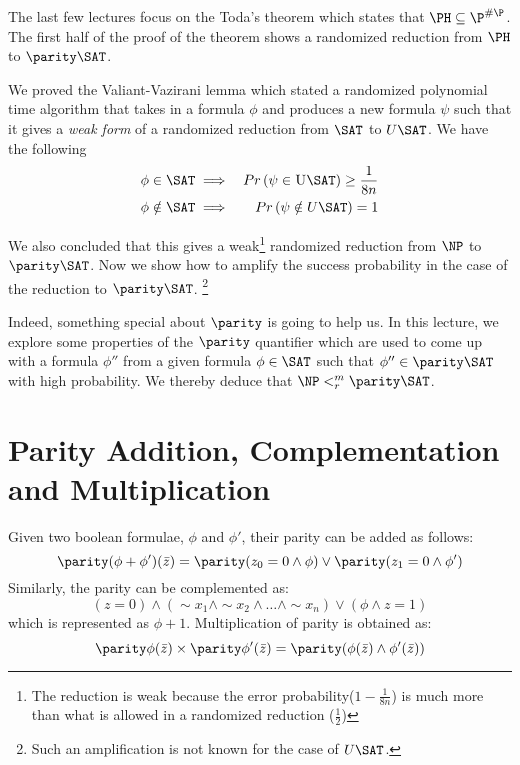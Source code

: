 \documentclass[11pt]{article}
\begin{document}
	

The last few lectures focus on the Toda's theorem which states
that $\PH \subseteq \P^{\#\P}$. The first half of the proof of the theorem
shows a randomized reduction from $\PH$ to $\parity \SAT$. 

We proved the Valiant-Vazirani lemma which stated a randomized polynomial time algorithm that takes in a formula $\phi$ and produces a new formula $\psi$ such that it gives a {\em weak form} of a randomized reduction from $\SAT$ to $U\SAT$.  We have the following 
\begin{eqnarray*}
\phi \in \SAT & \implies & Pr \left( \psi \in \textrm{\sc U\SAT} \right) \ge \frac{1}{8n} \\
\phi \notin \SAT & \implies & Pr \left( \psi \notin {\sc U\SAT} \right) = 1
\end{eqnarray*}

We also concluded that this gives a weak\footnote{The reduction is weak because the error probability($1-\frac{1}{8n}$) is much more than what is allowed in a randomized reduction ($\frac{1}{2}$)} randomized reduction from $\NP$ to $\parity\SAT$.  Now we show how to amplify the success probability in the case of the reduction to $\parity \SAT$. \footnote{Such an amplification is not known for the case of $U\SAT$.}

Indeed, something special about $\parity$ is going to help us. In this lecture, we explore some properties of the $\parity$ quantifier which are used to come up with a formula $\phi''$ from a given formula $\phi \in \SAT $ such that $\phi'' \in \parity \SAT$ with high probability. We thereby deduce that $\NP <^m_r \parity \SAT$.

\section{Parity Addition, Complementation and Multiplication}
Given two boolean formulae, $\phi $ and $\phi'$, their parity can be added as follows: 
\[\parity(\phi + \phi')(\bar z) = \parity(z_0 = 0 \wedge \phi) \vee \parity(z_1 = 0 \wedge \phi')  \]
Similarly, the parity can be complemented as: 
\[(z= 0 )\wedge (\sim x_1 \wedge \sim x_2 \wedge \ldots \wedge \sim x_n ) \vee (\phi \wedge z = 1)\]
which is represented as $\phi + 1$.
Multiplication of parity is obtained as: 
\[\parity \phi(\bar z) \times \parity \phi'(\bar z) = \parity (\phi(\bar z) \wedge \phi'(\bar z)) \]
\end{document}
